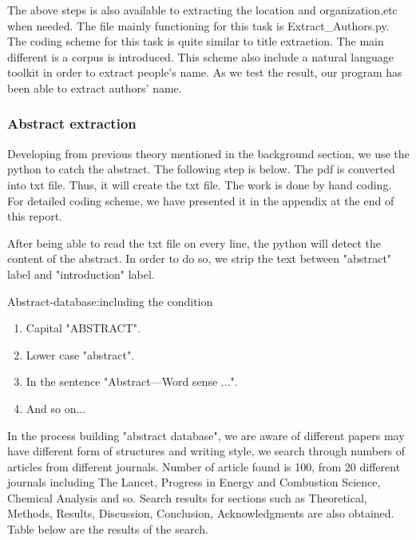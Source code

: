 The above steps is also available to extracting the location and organization,etc when needed. 
The file mainly functioning for this task is Extract_Authors.py.
The coding scheme for this task is quite similar to title extraction.
The main different is a corpus is introduced.
This scheme also include a natural language toolkit in order to extract people's name. 
As we test the result, our program has been able to extract authors' name.

\subsubsection{Abstract extraction}

	Developing from previous theory mentioned in the background section, we use the python to catch the abstract.
	The following step is below.
	The pdf is converted into txt file.
	Thus, it will create the txt file.
	The work is done by hand coding.
	For detailed coding scheme, we have presented it in the appendix at the end of this report.
	 
	After being able to read the txt file on every line, the python will detect the content of the abstract.
	In order to do so, we strip the text between "abstract" label and "introduction" label.	
	
	Abstract-database:including the condition
	
	\begin{enumerate}
		
		\item Capital         "ABSTRACT".
		\item Lower case      "abstract".
		\item In the sentence "Abstract—Word sense ...".
		\item And so on...
		
	\end{enumerate}
	
	In the process building "abstract database", we are aware of different papers may have different form of structures 
	and writing style, we search through numbers of articles from different journals.
	Number of article found is 100, from 20 different journals including The Lancet, Progress in Energy and Combustion Science, Chemical Analysis and so.
	Search results for sections such as Theoretical, Methods, Results, Discussion, Conclusion, Acknowledgments are also obtained.
	Table below are the results of the search.
	
